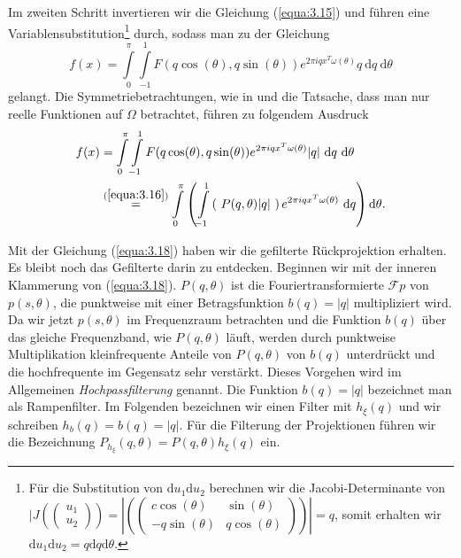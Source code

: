 Im zweiten Schritt invertieren wir die Gleichung (\ref{equa:3.15}) und führen eine Variablensubstitution\footnote{Für die Substitution von $\mbox{d}u_1\mbox{d}u_2$ berechnen wir die Jacobi-Determinante von $ |J(\left(\begin{array}{c} u_1 \\ u_2 \end{array}\right)) = \left| \left(\begin{pmatrix}{c} \cos(\theta) & \sin(\theta) \\ -q\sin(\theta) & q\cos(\theta) \end{pmatrix}\right)\right| = q$, somit erhalten wir $\mbox{d}u_1\mbox{d}u_2 = q\mbox{d}q\mbox{d}\theta$.} durch, sodass man zu der Gleichung  
\begin{equation}
	f(x) = \int \limits_{0}^{\pi} \int \limits_{-1}^{1}F(q\cos(\theta), q\sin(\theta))e^{2\pi i qx^T\omega(\theta)} q \ \mbox{d}q \ \mbox{d}\theta
	\label{equa:3.17}
\end{equation}
gelangt. Die Symmetriebetrachtungen, wie in \cite[S. 135]{Buzug04} und die Tatsache, dass man nur reelle Funktionen auf $\Omega$ betrachtet, führen zu folgendem Ausdruck
\begin{equation}
	\begin{split}
		f(x) & = \int \limits_{0}^{\pi} \int \limits_{-1}^{1}F(q\cos(\theta), q\sin(\theta))e^{2\pi i qx^T\omega(\theta)} |q| \ \mbox{d}q \ \mbox{d}\theta \\
		& \stackrel{(\ref{equa:3.16})}{=} \int \limits_{0}^{\pi} \left( \int \limits_{-1}^{1} \left( \ P(q, \theta)|q| \ \right) e^{2\pi i qx^T\omega(\theta)} \ \mbox{d}q \right) \mbox{d}\theta.
	\end{split}
	\label{equa:3.18}
\end{equation}

Mit der Gleichung (\ref{equa:3.18}) haben wir die gefilterte Rückprojektion erhalten. Es bleibt noch das Gefilterte darin zu entdecken. Beginnen wir mit der inneren Klammerung von (\ref{equa:3.18}). $P(q, \theta)$ ist die Fouriertransformierte $\mathcal{F}p$ von $p(s,\theta)$, die punktweise mit einer Betragsfunktion $b(q) = |q|$ multipliziert wird. Da wir jetzt $p(s, \theta)$ im Frequenzraum betrachten und die Funktion $b(q)$ über das gleiche Frequenzband, wie $P(q,\theta)$ läuft, werden durch punktweise Multiplikation kleinfrequente Anteile von $P(q,\theta)$ von $b(q)$ unterdrückt und die hochfrequente im Gegensatz sehr verstärkt. Dieses Vorgehen wird im Allgemeinen \textit{Hochpassfilterung} genannt. Die Funktion $b(q) = |q|$ bezeichnet man als Rampenfilter. Im Folgenden bezeichnen wir einen Filter mit $h_{\xi}(q)$ und wir schreiben $h_{b}(q) = b(q) = |q|$. Für die Filterung der Projektionen führen wir die Bezeichnung $P_{h_{\xi}}(q, \theta) = P(q, \theta)h_{\xi}(q)$ ein.

